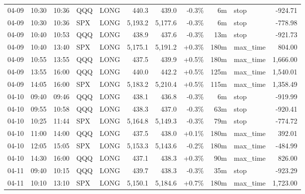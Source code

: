 \documentclass[11pt,a4paper,twoside]{article}
\begin{document}
\begin{center}
\begin{longtable}{>{\color{txtmain}}l l l l l r r r r >{\color{txtmain}}l r}
04-09 & 10:30 & 10:36 & QQQ & LONG & 440.3 & 439.0 & \textcolor{lossred}{-0.3\%} & 6m & stop & \textcolor{lossred}{-924.71} \\
04-09 & 10:30 & 10:36 & SPX & LONG & 5,193.2 & 5,177.6 & \textcolor{lossred}{-0.3\%} & 6m & stop & \textcolor{lossred}{-778.98} \\
04-09 & 10:40 & 10:53 & QQQ & LONG & 438.9 & 437.6 & \textcolor{lossred}{-0.3\%} & 13m & stop & \textcolor{lossred}{-921.73} \\
04-09 & 10:40 & 13:40 & SPX & LONG & 5,175.1 & 5,191.2 & \textcolor{wingreen}{+0.3\%} & 180m & max\_time & \textcolor{wingreen}{804.00} \\
04-09 & 10:55 & 13:55 & QQQ & LONG & 437.5 & 439.9 & \textcolor{wingreen}{+0.5\%} & 180m & max\_time & \textcolor{wingreen}{1,666.00} \\
04-09 & 13:55 & 16:00 & QQQ & LONG & 440.0 & 442.2 & \textcolor{wingreen}{+0.5\%} & 125m & max\_time & \textcolor{wingreen}{1,540.01} \\
04-09 & 14:05 & 16:00 & SPX & LONG & 5,183.2 & 5,210.4 & \textcolor{wingreen}{+0.5\%} & 115m & max\_time & \textcolor{wingreen}{1,358.49} \\
04-10 & 09:40 & 09:46 & QQQ & LONG & 438.1 & 436.8 & \textcolor{lossred}{-0.3\%} & 6m & stop & \textcolor{lossred}{-919.99} \\
04-10 & 09:55 & 10:58 & QQQ & LONG & 438.3 & 437.0 & \textcolor{lossred}{-0.3\%} & 63m & stop & \textcolor{lossred}{-920.41} \\
04-10 & 10:25 & 11:44 & SPX & LONG & 5,164.8 & 5,149.3 & \textcolor{lossred}{-0.3\%} & 79m & stop & \textcolor{lossred}{-774.72} \\
04-10 & 11:00 & 14:00 & QQQ & LONG & 437.5 & 438.0 & \textcolor{wingreen}{+0.1\%} & 180m & max\_time & \textcolor{wingreen}{392.01} \\
04-10 & 12:05 & 15:05 & SPX & LONG & 5,153.3 & 5,143.6 & \textcolor{lossred}{-0.2\%} & 180m & max\_time & \textcolor{lossred}{-484.99} \\
04-10 & 14:30 & 16:00 & QQQ & LONG & 437.1 & 438.3 & \textcolor{wingreen}{+0.3\%} & 90m & max\_time & \textcolor{wingreen}{826.00} \\
04-11 & 09:40 & 10:15 & QQQ & LONG & 439.7 & 438.3 & \textcolor{lossred}{-0.3\%} & 35m & stop & \textcolor{lossred}{-923.29} \\
04-11 & 10:10 & 13:10 & SPX & LONG & 5,150.1 & 5,184.6 & \textcolor{wingreen}{+0.7\%} & 180m & max\_time & \textcolor{wingreen}{1,723.00} \\

\end{longtable}
\end{center}
\end{document}
